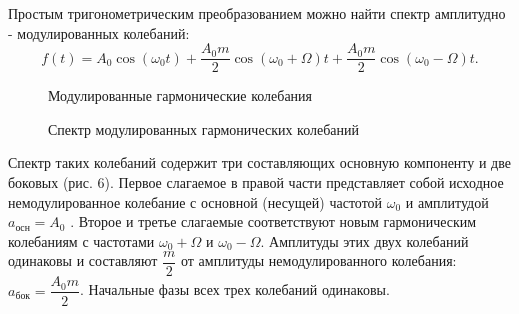 \documentclass[12pt,a4paper]{article}
\begin{document}
\begin{enumerate}
	Простым тригонометрическим преобразованием можно найти спектр амплитудно - модулированных колебаний:
	\\
\begin{equation}\label{a}
	f(t)=A_{0}\cos(\omega_{0} t)+\dfrac{A_{0}m}{2}\cos(\omega_{0}+\Omega)t+\dfrac{A_{0}m}{2}\cos(\omega_{0}-\Omega)t.
\end{equation}
	
	\begin{figure}[h]
		\vspace{-1ex}
		\begin{minipage}[h]{0.5\linewidth}
		\caption{Модулированные гармонические колебания}
		\end{minipage}
		\begin{minipage}[h]{0.5\linewidth}
		\caption{Спектр модулированных гармонических колебаний}
		\end{minipage}
	\end{figure}
		
		
		Спектр таких колебаний содержит три составляющих  основную
		компоненту и две боковых (рис. 6). Первое слагаемое в правой части представляет собой исходное немодулированное колебание
		с основной (несущей) частотой $\omega_{0}$ и амплитудой $a_{осн} = A_{0}$ . Второе и третье слагаемые соответствуют новым гармоническим колебаниям с частотами $\omega_{0} + \Omega$ и $\omega_{0} - \Omega$. Амплитуды этих двух колебаний одинаковы и составляют $\dfrac{m}{2}$ от амплитуды немодулированного колебания:
		$a_{бок} = \dfrac{A_{0}m}{2}$. Начальные фазы всех трех колебаний одинаковы.
	\end{enumerate}
\end{document}
